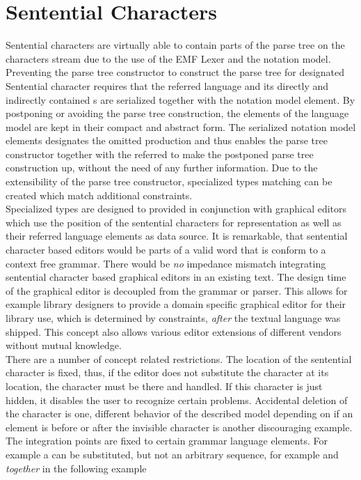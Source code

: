 \section{Sentential Characters}
Sentential characters are virtually able to contain parts of the parse tree on the characters stream due to the use of the EMF Lexer and the notation model. Preventing the parse tree constructor to construct the parse tree for designated Sentential character requires that the referred language  and its directly and indirectly contained s are serialized together with the notation model element. By postponing or avoiding the parse tree construction, the elements of the language model are kept in their compact and abstract form. The serialized notation model elements designates the omitted production and thus enables the parse tree constructor together with the referred  to make the postponed parse tree construction up, without the need of any further information. Due to the extensibility of the parse tree constructor, specialized types matching can be created which match additional constraints.  \\
Specialized types are designed to provided in conjunction with graphical editors which use the position of the sentential characters for representation as well as their referred language elements as data source. It is remarkable, that sentential character based editors would be parts of a valid word that is conform to a context free grammar. There would be \emph{no} impedance mismatch integrating sentential character based graphical editors in an existing text. The design time of the graphical editor is decoupled from the grammar or parser. This allows for example library designers to provide a domain specific graphical editor for their library use, which is determined by constraints, \emph{after} the textual language was shipped. This concept also allows various editor extensions of different vendors without mutual knowledge.\\
There are a number of concept related restrictions. The location of the sentential character is fixed, thus, if the editor does not substitute the character at its location, the character must be there and handled. If this character is just hidden, it disables the user to recognize certain problems. Accidental deletion of the character is one, different behavior of the described model depending on if an element is before or after the invisible character is another discouraging example. The integration points are fixed to certain grammar language elements. For example a  can be substituted, but not an arbitrary sequence, for example  and  \emph{together} in the following example\\
